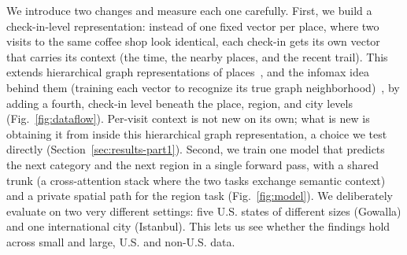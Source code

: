 We introduce two changes and measure each one carefully. First, we build a
check-in-level representation: instead of one fixed vector per place, where two
visits to the same coffee shop look identical, each check-in gets its own vector
that carries its context (the time, the nearby places, and the recent trail).
This extends hierarchical graph representations of places~\cite{huang2023hgi},
and the infomax idea behind them (training each vector to recognize its true
graph neighborhood)~\cite{velickovic2019dgi}, by adding a fourth,
check-in level beneath the place, region, and city levels
(Fig.~\ref{fig:dataflow}). Per-visit context is not new on its own; what is new
is obtaining it from inside this hierarchical graph representation, a choice we
test directly (Section~\ref{sec:results-part1}). Second, we train one model that
predicts the next category and the next region in a single forward pass, with a shared trunk (a cross-attention stack where the two tasks exchange
semantic context) and a private spatial path for the region task (Fig.~\ref{fig:model}). We deliberately evaluate on two very different
settings: five U.S. states of different sizes (Gowalla) and one international city
(Istanbul). This lets us see whether the findings hold across small and large, U.S.
and non-U.S. data.

